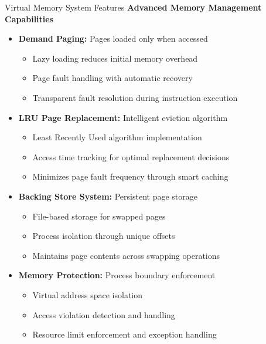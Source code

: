 \documentclass[10pt]{beamer}
\begin{document}
\begin{frame}{Virtual Memory System Features}
    \textbf{Advanced Memory Management Capabilities}
    
    \begin{itemize}
        \item \textbf{Demand Paging:} Pages loaded only when accessed
        \begin{itemize}
            \item Lazy loading reduces initial memory overhead
            \item Page fault handling with automatic recovery
            \item Transparent fault resolution during instruction execution
        \end{itemize}
        
        \item \textbf{LRU Page Replacement:} Intelligent eviction algorithm
        \begin{itemize}
            \item Least Recently Used algorithm implementation
            \item Access time tracking for optimal replacement decisions
            \item Minimizes page fault frequency through smart caching
        \end{itemize}
        
        \item \textbf{Backing Store System:} Persistent page storage
        \begin{itemize}
            \item File-based storage for swapped pages
            \item Process isolation through unique offsets
            \item Maintains page contents across swapping operations
        \end{itemize}
        
        \item \textbf{Memory Protection:} Process boundary enforcement
        \begin{itemize}
            \item Virtual address space isolation
            \item Access violation detection and handling
            \item Resource limit enforcement and exception handling
        \end{itemize}
    \end{itemize}
\end{frame}
\end{document}
